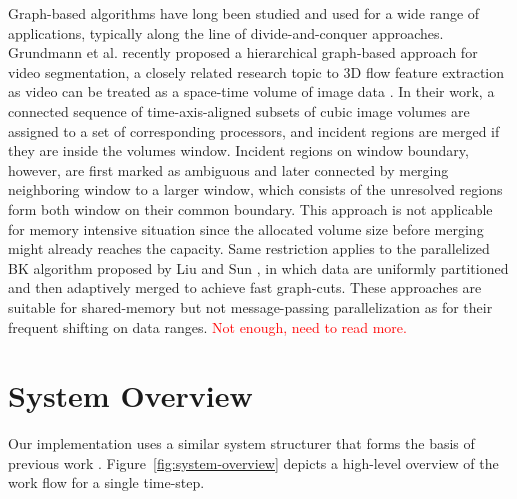 \documentclass[10pt, conference, compsocconf]{IEEEtran}
\begin{document}
Graph-based algorithms have long been studied and used for a wide range of applications, typically along the line of divide-and-conquer approaches.
Grundmann et al. \cite{Grundmann2010} recently proposed a hierarchical graph-based approach for video segmentation, a closely related research topic to 3D flow feature extraction as video can be treated as a space-time volume of image data \cite{Klein2002}. In their work, a connected sequence of time-axis-aligned subsets of cubic image volumes are assigned to a set of corresponding processors, and incident regions are merged if they are inside the volumes window. Incident regions on window boundary, however, are first marked as ambiguous and later connected by merging neighboring window to a larger window, which consists of the unresolved regions form both window on their common boundary. This approach is not applicable for memory intensive situation since the allocated volume size before merging might already reaches the capacity. Same restriction applies to the parallelized BK algorithm \cite{Boykov2004} proposed by Liu and Sun \cite{Liu2010}, in which data are uniformly partitioned and then adaptively merged to achieve fast graph-cuts. These approaches are suitable for shared-memory but not message-passing parallelization as for their frequent shifting on data ranges. \textcolor{red}{Not enough, need to read more.}

\section{System Overview}
Our implementation uses a similar system structurer that forms the basis of previous work \cite{Muelder2009}. Figure~\ref{fig:system-overview} depicts a high-level overview of the work flow for a single time-step. 
\end{document}
